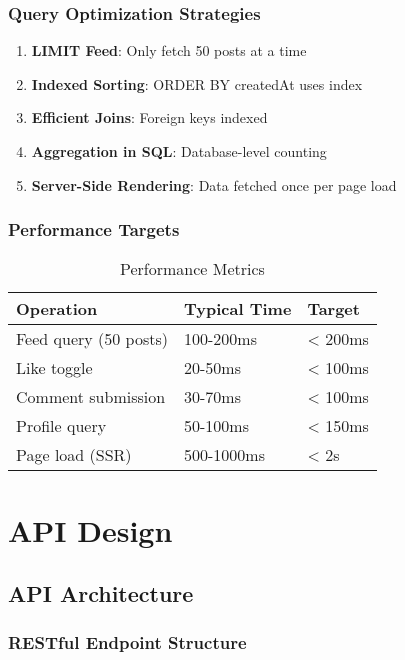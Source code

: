 \documentclass[12pt,a4paper]{report}
\begin{document}
\subsection{Query Optimization Strategies}

\begin{enumerate}
    \item \textbf{LIMIT Feed}: Only fetch 50 posts at a time
    \item \textbf{Indexed Sorting}: ORDER BY createdAt uses index
    \item \textbf{Efficient Joins}: Foreign keys indexed
    \item \textbf{Aggregation in SQL}: Database-level counting
    \item \textbf{Server-Side Rendering}: Data fetched once per page load
\end{enumerate}

\subsection{Performance Targets}

\begin{table}[H]
\centering
\caption{Performance Metrics}
\begin{tabular}{@{}lll@{}}
\toprule
\textbf{Operation} & \textbf{Typical Time} & \textbf{Target} \\ \midrule
Feed query (50 posts) & 100-200ms & < 200ms \\
Like toggle & 20-50ms & < 100ms \\
Comment submission & 30-70ms & < 100ms \\
Profile query & 50-100ms & < 150ms \\
Page load (SSR) & 500-1000ms & < 2s \\ \bottomrule
\end{tabular}
\end{table}

\chapter{API Design}

\section{API Architecture}

\subsection{RESTful Endpoint Structure}
\end{document}
